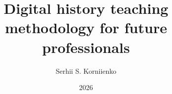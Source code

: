 \documentclass[14pt]{extreport}
\title{Digital history teaching methodology for future professionals}
\author{Serhii S. Korniienko}
\date{2026}
\newif\ifinrealbib
\begin{document}


\maketitle
\setcounter{page}{2}



\makeabstract
\tableofcontents




\makeintro

\begin{mainf}




\end{mainf}



\makeconc

\begin{bibliof}
\inrealbibtrue

\inrealbibfalse
\end{bibliof}


\end{document}
